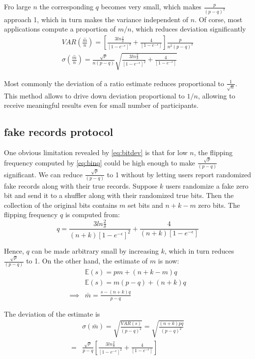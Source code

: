 \documentclass[11pt]{article}
\newcommand{\E}{\mathbb{E}} %
\begin{document}
Fro large $n$ the corresponding $q$ becomes very small, which makes $ \frac{p}{(p-q)^2}$ approach 1, which in turn makes the variance independent of $n$.
Of corse, most applications compute a proportion of $m/n$, which reduces deviation significantly
\begin{align}
VAR(\bar{\frac{m}{n}}) = \left [ \frac  { 3  ln\frac{2}{\delta}}  {\left [ 1 - e^{-\epsilon}\right ] ^2}  + \frac{4}{\left [ 1 - e^{-\epsilon}\right ] }  \right ] \frac{p}{n^2(p-q)^2} \\
\sigma(\bar{\frac{m}{n}}) = \frac{\sqrt{p}}{n(p-q)} \sqrt{ \frac  { 3  ln\frac{2}{\delta}}  {\left [ 1 - e^{-\epsilon}\right ] ^2}  + \frac{4}{\left [ 1 - e^{-\epsilon}\right ] }} \label{eq:bitdev}
\end{align}

Most commonly the deviation of a ratio estimate reduces proportional to $\frac{1}{\sqrt{n}}$.  This method allows to drive down deviation proportional to $1/n$, allowing to receive meaningful results even for small number of participants.

\subsection{fake records protocol}

One obvious limitation revealed by \ref{eq:bitdev} is that for low $n$, the flipping frequency computed by \ref{eq:binq} could be high enough to make $\frac{\sqrt{p}}{(p-q)}$ significant.   We can reduce $\frac{\sqrt{p}}{(p-q)}$  to 1 without by letting users report randomized fake records along with their true records.  Suppose $k$ users randomize a fake zero bit and send it to a shuffler along with their randomized true bits.  Then the collection of the original bits contains $m$ set bits and $n+k - m$ zero bits.  The flipping frequency $q$ is computed from:
\[ q = \frac  { 3  ln\frac{2}{\delta}}  { (n+k) \left [ 1 - e^{-\epsilon}\right ] ^2}  + \frac{4}{(n+k) \left [ 1 - e^{-\epsilon}\right ] } \]

Hence, $q$ can be made arbitrary small by increasing $k$, which in turn reduces $\frac{\sqrt{p}}{(p-q)}$  to 1.   On the other hand, the estimate of $m$ is now:
\begin{align*}
& \E(s) = pm + (n+k-m)q \\
& \E(s) = m(p-q) + (n+k)q \\
\implies & \bar{m} = \frac{s - (n+k)q}{p-q}
\end{align*}

The deviation of the estimate is
\begin{align}
& \sigma(\bar{m}) =  \sqrt { \frac{VAR(s)}{ (p-q)^2}} =  \sqrt {\frac{(n+k)pq}{ (p-q)^2} } \\
= &  \frac{\sqrt{p}}{p-q} \left [ \frac  { 3  ln\frac{2}{\delta}}  {\left [ 1 - e^{-\epsilon}\right ] ^2}  + \frac{4}{\left [ 1 - e^{-\epsilon}\right ] }  \right ] \label{eq:bins}
\end{align}
\end{document}
